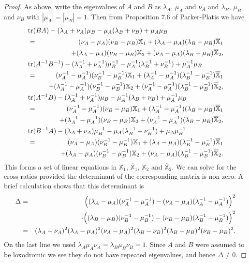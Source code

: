 \documentclass[11pt]{amsart}
\numberwithin{equation}{section}
\begin{document}
\begin{proof}
As above, write the eigenvalues of $A$ and $B$ as 
$\lambda_A$, $\mu_A$ and $\nu_A$ and $\lambda_B$, $\mu_B$ and $\nu_B$ with $|\mu_A|=|\mu_B|=1$.
Then from Proposition 7.6 of Parker-Platis \cite{PP} we have
\begin{eqnarray*}
\lefteqn{{\rm tr}(BA)-(\lambda_A+\nu_A)\mu_B-\mu_A(\lambda_B+\nu_B)+\mu_A\mu_B} \\
& = & (\nu_A-\mu_A)(\nu_B-\mu_B){\mathbb X}_1 
+(\lambda_A-\mu_A)(\lambda_B-\mu_B)\overline{\mathbb X}_1 \\
&& \quad +(\lambda_A-\mu_A)(\nu_B-\mu_B){\mathbb X}_2
+(\nu_A-\mu_A)(\lambda_B-\mu_B)\overline{\mathbb X}_2, \\
\lefteqn{{\rm tr}(A^{-1}B^{-1})-(\lambda_A^{-1}+\nu_A^{-1})\mu_B^{-1}
-\mu_A^{-1}(\lambda_B^{-1}+\nu_B^{-1})+\mu_A^{-1}\mu_B} \\
& = & (\nu_A^{-1}-\mu_A^{-1})(\nu_B^{-1}-\mu_B^{-1}){\mathbb X}_1 
+(\lambda_A^{-1}-\mu_A^{-1})(\lambda_B^{-1}-\mu_B^{-1})\overline{\mathbb X}_1 \\
&& \quad +(\lambda_A^{-1}-\mu_A^{-1})(\nu_B^{-1}-\mu_B^{-1}){\mathbb X}_2
+(\nu_A^{-1}-\mu_A^{-1})(\lambda_B^{-1}-\mu_B^{-1})\overline{\mathbb X}_2, \\
\lefteqn{{\rm tr}(A^{-1}B)-(\lambda_A^{-1}+\nu_A^{-1})\mu_B-\mu_A^{-1}(\lambda_B+\nu_B)+\mu_A^{-1}\mu_B} \\
& = & (\nu_A^{-1}-\mu_A^{-1})(\nu_B-\mu_B){\mathbb X}_1 
+(\lambda_A^{-1}-\mu_A^{-1})(\lambda_B-\mu_B)\overline{\mathbb X}_1 \\
&& \quad +(\lambda_A^{-1}-\mu_A^{-1})(\nu_B-\mu_B){\mathbb X}_2
+(\nu_A^{-1}-\mu_A^{-1})(\lambda_B-\mu_B)\overline{\mathbb X}_2, \\
\lefteqn{{\rm tr}(B^{-1}A)-(\lambda_A+\nu_A)\mu_B^{-1}-\mu_A(\lambda_B^{-1}+\nu_B^{-1})+\mu_A\mu_B^{-1}} \\
& = & (\nu_A-\mu_A)(\nu_B^{-1}-\mu_B^{-1}){\mathbb X}_1 
+(\lambda_A-\mu_A)(\lambda_B^{-1}-\mu_B^{-1})\overline{\mathbb X}_1 \\
&& \quad +(\lambda_A-\mu_A)(\nu_B^{-1}-\mu_B^{-1}){\mathbb X}_2
+(\nu_A-\mu_A)(\lambda_B^{-1}-\mu_B^{-1})\overline{\mathbb X}_2.
\end{eqnarray*}
This forms a set of linear equations in ${\mathbb X}_1$, $\overline{\mathbb X}_1$, 
${\mathbb X}_2$ and $\overline{\mathbb X}_2$. We can solve for the cross-ratios provided the determinant of
the corresponding matrix is non-zero. A brief calculation shows that this determinant is
\begin{eqnarray*}
\Delta & = & \Bigl( (\lambda_A-\mu_A)(\nu_A^{-1}-\mu_A^{-1})-(\nu_A-\mu_A)(\lambda^{-1}_A-\mu^{-1}_A)\Bigr)^2 \\
&& \quad \cdot \Bigl( (\lambda_B-\mu_B)(\nu_B^{-1}-\mu_B^{-1})-(\nu_B-\mu_B)(\lambda^{-1}_B-\mu^{-1}_B)\Bigr)^2 \\
& = & (\lambda_A-\nu_A)^2(\lambda_A-\mu_A)^2(\nu_A-\mu_A)^2
(\lambda_B-\nu_B)^2(\lambda_B-\mu_B)^2(\nu_B-\mu_B)^2.
\end{eqnarray*}
On the last line we used $\lambda_A\mu_A\nu_A=\lambda_B\mu_B\nu_B=1$. Since $A$ and $B$ were assumed
to be loxodromic we see they do not have repeated eigenvalues, and hence $\Delta\neq 0$.


\end{proof}
\end{document}
